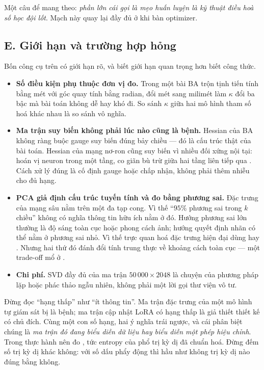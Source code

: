 \documentclass[../../../deep_learning.tex]{subfiles}
\begin{document}
Một câu để mang theo: \emph{phần lớn cái gọi là mẹo huấn luyện là kỹ thuật điều hoà số học đội lốt}. Mạch này quay lại đầy đủ ở  khi bàn optimizer.

\subsection{E. Giới hạn và trường hợp hỏng}
Bốn công cụ trên có giới hạn rõ, và biết giới hạn quan trọng hơn biết công thức.

\begin{itemize}
\item \textbf{Số điều kiện phụ thuộc đơn vị đo.} Trong một bài BA trộn tịnh tiến tính bằng mét với góc quay tính bằng radian, đổi mét sang milimét làm \(\kappa\) đổi ba bậc mà bài toán không dễ hay khó đi. So sánh \(\kappa\) giữa hai mô hình tham số hoá khác nhau là so sánh vô nghĩa.
\item \textbf{Ma trận suy biến không phải lúc nào cũng là bệnh.} Hessian của BA không ràng buộc gauge suy biến đúng bảy chiều --- đó là cấu trúc thật của bài toán. Hessian của mạng nơ-ron cũng suy biến vì nhiều đối xứng nội tại: hoán vị neuron trong một tầng, co giãn bù trừ giữa hai tầng liên tiếp qua . Cách xử lý đúng là cố định gauge hoặc chấp nhận, không phải thêm nhiễu cho đủ hạng.
\item \textbf{PCA giả định cấu trúc tuyến tính và đo bằng phương sai.} Đặc trưng của mạng sâu nằm trên một đa tạp cong. Vì thế ``\(95\%\) phương sai trong \(k\) chiều'' không có nghĩa thông tin hữu ích nằm ở đó. Hướng phương sai lớn thường là độ sáng toàn cục hoặc phong cách ảnh; hướng quyết định nhãn có thể nằm ở phương sai nhỏ. 
Vì thế trực quan hoá đặc trưng hiện đại dùng  \cite{maaten2008tsne} hay  \cite{mcinnes2018umap}. Nhưng hai thứ đó đánh đổi tính trung thực về khoảng cách toàn cục --- một trade-off mổ ở .
\item \textbf{Chi phí.} SVD đầy đủ của ma trận \(50\,000\times2048\) là chuyện của phương pháp lặp hoặc phác thảo ngẫu nhiên, không phải một lời gọi thư viện vô tư.
\end{itemize}

\begin{cambay}
Đừng đọc ``hạng thấp'' như ``ít thông tin''. Ma trận đặc trưng của một mô hình tự giám sát bị  là bệnh; ma trận cập nhật LoRA có hạng thấp là giả thiết thiết kế có chủ đích. Cùng một con số hạng, hai ý nghĩa trái ngược, và cái phân biệt chúng là \emph{ma trận đó đang biểu diễn dữ liệu hay biểu diễn một phép hiệu chỉnh}. Trong thực hành nên đo , tức entropy của phổ trị kỳ dị đã chuẩn hoá. Đừng đếm số trị kỳ dị khác không: với số dấu phẩy động thì hầu như không trị kỳ dị nào đúng bằng không.
\end{cambay}
\end{document}
